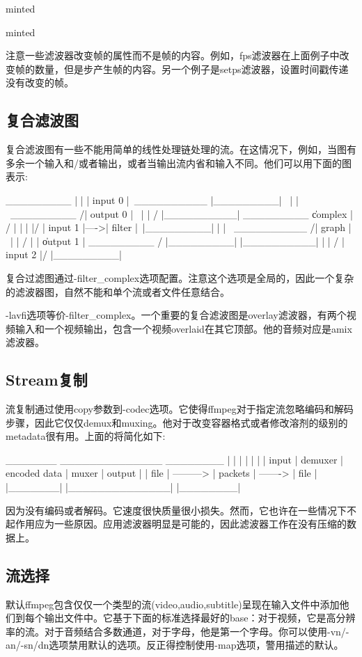 \documentclass{article}
\begin{document}
{\begin{Text}{minted}
\begin{Text}{minted}
\begin{Textcode}
\end{Textcode}
注意一些滤波器改变帧的属性而不是帧的内容。例如，fps滤波器在上面例子中改变帧的数量，但是步产生帧的内容。另一个例子是setps滤波器，设置时间戳传递没有改变的帧。
\subsection{复合滤波图}
复合滤波图有一些不能用简单的线性处理链处理的流。在这情况下，例如，当图有多余一个输入和/或者输出，或者当输出流内省和输入不同。他们可以用下面的图表示:
\begin{Textcode}
 _________
|         |
| input 0 |\                    __________
|_________| \                  |          |
             \   _________    /| output 0 |
              \ |         |  / |__________|
 _________     \| complex | /
|         |     |         |/
| input 1 |---->| filter  |\
|_________|     |         | \   __________
               /| graph   |  \ |          |
              / |         |   \| output 1 |
 _________   /  |_________|    |__________|
|         | /
| input 2 |/
|_________|

\end{Textcode}
复合过滤图通过-filter\_complex选项配置。注意这个选项是全局的，因此一个复杂的滤波器图，自然不能和单个流或者文件任意结合。

-lavfi选项等价-filter\_complex。一个重要的复合滤波图是overlay滤波器，有两个视频输入和一个视频输出，包含一个视频overlaid在其它顶部。他的音频对应是amix滤波器。
\subsection{Stream复制}
流复制通过使用copy参数到-codec选项。它使得ffmpeg对于指定流忽略编码和解码步骤，因此它仅仅demux和muxing。他对于改变容器格式或者修改溶剂的级别的metadata很有用。上面的将简化如下:
\begin{Textcode}
 _______              ______________            ________
|       |            |              |          |        |
| input |  demuxer   | encoded data |  muxer   | output |
| file  | ---------> | packets      | -------> | file   |
|_______|            |______________|          |________|

\end{Textcode}
因为没有编码或者解码。它速度很快质量很小损失。然而，它也许在一些情况下不起作用应为一些原因。应用滤波器明显是可能的，因此滤波器工作在没有压缩的数据上。
\subsection{流选择}
默认ffmpeg包含仅仅一个类型的流(video,audio,subtitle)呈现在输入文件中添加他们到每个输出文件中。它基于下面的标准选择最好的base：对于视频，它是高分辨率的流。对于音频结合多数通道，对于字母，他是第一个字母。你可以使用-vn/-an/-sn/dn选项禁用默认的选项。反正得控制使用-map选项，警用描述的默认。

\end{Text}
\end{Text}}
\end{document}
